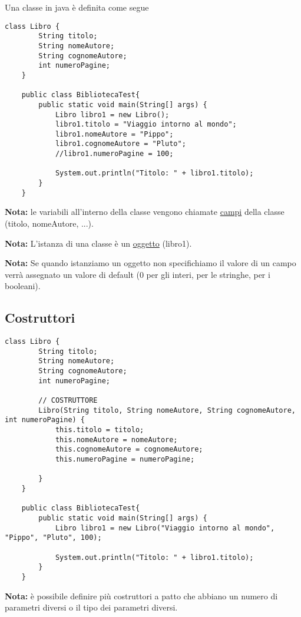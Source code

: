 \documentclass[../main.tex]{subfiles}
\begin{document}
Una classe in java è definita come segue
\begin{lstlisting}[style=java]
    class Libro {
        String titolo;
        String nomeAutore;
        String cognomeAutore;
        int numeroPagine;
    }

    public class BibliotecaTest{
        public static void main(String[] args) {
            Libro libro1 = new Libro();
            libro1.titolo = "Viaggio intorno al mondo";
            libro1.nomeAutore = "Pippo";
            libro1.cognomeAutore = "Pluto";
            //libro1.numeroPagine = 100;

            System.out.println("Titolo: " + libro1.titolo);
        }
    }
\end{lstlisting}
\textbf{Nota:} le variabili all'interno della classe  vengono chiamate \underline{campi} della classe (titolo, nomeAutore, ...).

\textbf{Nota:} L'istanza di una classe è un \underline{oggetto} (libro1).

\textbf{Nota:} Se quando istanziamo un oggetto non specifichiamo il valore di un campo verrà assegnato un valore di default
(0 per gli interi,  per le stringhe,  per i booleani).

\vspace{0.5cm}
\subsection{Costruttori}
\begin{lstlisting}[style=java]
    class Libro {
        String titolo;
        String nomeAutore;
        String cognomeAutore;
        int numeroPagine;

        // COSTRUTTORE
        Libro(String titolo, String nomeAutore, String cognomeAutore, int numeroPagine) {
            this.titolo = titolo;
            this.nomeAutore = nomeAutore;
            this.cognomeAutore = cognomeAutore;
            this.numeroPagine = numeroPagine;

        }
    }

    public class BibliotecaTest{
        public static void main(String[] args) {
            Libro libro1 = new Libro("Viaggio intorno al mondo", "Pippo", "Pluto", 100);

            System.out.println("Titolo: " + libro1.titolo);
        }
    }
\end{lstlisting}

\textbf{Nota:} è possibile definire più costruttori a patto che abbiano un numero di parametri diversi o il tipo dei parametri diversi.
\end{document}
